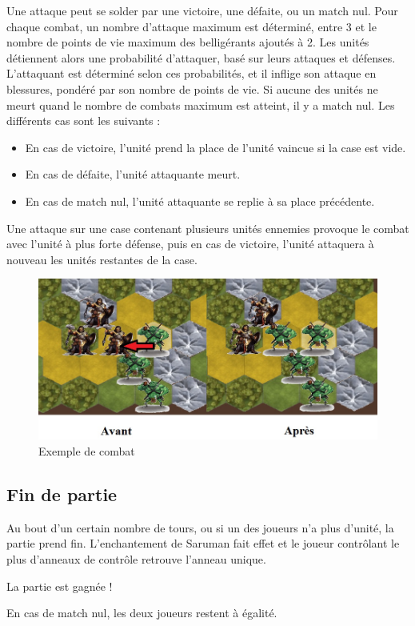 Une attaque peut se solder par une victoire, une défaite, ou un match nul.
\newline
Pour chaque combat, un nombre d'attaque maximum est déterminé, entre 3 et le nombre de points de vie maximum des belligérants ajoutés à 2.
\newline
\newline
Les unités détiennent alors une probabilité d'attaquer, basé sur leurs attaques et défenses.
\newline
 L'attaquant est déterminé selon ces probabilités, et il inflige son attaque en blessures, pondéré par son nombre de points de vie.
\newline
Si aucune des unités ne meurt quand le nombre de combats maximum est atteint, il y a match nul.
\newline
\newline
 Les différents cas sont les suivants :
\begin{itemize}
\item En cas de victoire, l'unité prend la place de l'unité vaincue si la case est vide.
\item En cas de défaite, l'unité attaquante meurt.
\item En cas de match nul, l'unité attaquante se replie à sa place précédente.
\newline
\end{itemize}
Une attaque sur une case contenant plusieurs unités ennemies provoque le combat avec l'unité à plus forte défense, puis en cas de victoire, l'unité attaquera à nouveau les unités restantes de la case.

\begin{figure}[ht!]
\centering
\includegraphics[scale=0.50]{img/fincombat.jpg}
\caption{Exemple de combat}
\end{figure}

\newpage
\subsection{Fin de partie}

Au bout d'un certain nombre de tours, ou si un des joueurs n'a plus d'unité, la partie prend fin. 
\newline
L'enchantement de Saruman fait effet et le joueur contrôlant le plus d'anneaux de contrôle retrouve l'anneau unique. 
\newline
\begin{center}
La partie est gagnée !
\end{center}
\begin{center}
En cas de match nul, les deux joueurs restent à égalité.
\end{center}